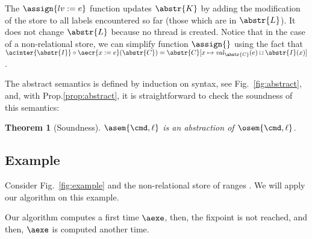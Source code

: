 \documentclass[12pt]{article}
\let\savesqcup\sqcup
\let\sqcup\savesqcup
\newcounter{labels}[figure]
\newcommand{\aecra}[2]{\aecr{#1}(#2)}
\newtheorem{theorem}{Theorem}
\begin{document}
The \(\assign{lv:=e}\) function updates \(\abstr{K}\) by adding the modification of the store to all labels encountered so far (those which are in \(\abstr{L}\)).
It does not change \(\abstr{L}\) because no thread is created.
Notice that in the case of a non-relational store, we can simplify function \(\assign{}\) using the fact that \( \acinter{\abstr{I}}\circ\aecra{x:=e}{\abstr{C}} = \fx{\abstr{C}}{x}{\mathit{val}_{\abstr{C}}(e)\sqcup \abstr{I}(x)} \). 

The abstract semantics is defined by induction on syntax, see Fig.~\ref{fig:abstract}, and, with Prop.\ref{prop:abstract}, it is straightforward to check the soundness of this semantics:
\begin{theorem}[Soundness]\label{sounda}
 \(\asem{\cmd,\ell}\) is an abstraction of \( \osem{\cmd,\ell} \).
\end{theorem}
\figabstractsemantics


\subsection{Example}



Consider Fig.~\ref{fig:example} and the non-relational store of ranges \cite{CousotCousot04-WCC}.
We will apply our algorithm on this example.

Our algorithm computes a first time \(\aexe\), then, the fixpoint is not reached, and then, \(\aexe\) is computed another time.
\end{document}
